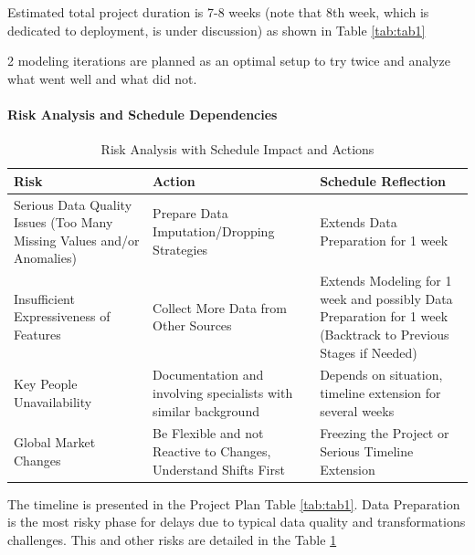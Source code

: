 \documentclass[oneside,final,12pt,a4paper]{extreport}
\begin{document}
Estimated total project duration is 7-8 weeks (note that 8th week, which is dedicated to deployment, is under discussion) as shown in Table \ref{tab:tab1}

2 modeling iterations are planned as an optimal setup to try twice and analyze what went well and what did not.

\paragraph{Risk Analysis and Schedule Dependencies}

\begin{table}[h!]
\centering
\small
\begin{tabular}{|p{5cm}|p{5cm}|p{5cm}|}
\hline
\textbf{Risk} & \textbf{Action} & \textbf{Schedule Reflection} \\
\hline
Serious Data Quality Issues (Too Many Missing Values and/or Anomalies) & Prepare Data Imputation/Dropping Strategies  & Extends Data Preparation for 1 week  \\
\hline
Insufficient Expressiveness of Features & Collect More Data from Other Sources & Extends Modeling for 1 week and possibly Data Preparation for 1 week (Backtrack to Previous Stages if Needed) \\
\hline
Key People Unavailability & Documentation and involving specialists with similar background & Depends on situation, timeline extension for several weeks \\
\hline
Global Market Changes & Be Flexible and not Reactive to Changes, Understand Shifts First & Freezing the Project or Serious Timeline Extension \\
\hline
\end{tabular}
\caption{Risk Analysis with Schedule Impact and Actions}
\label{tab:tab2}
\end{table}

\par The timeline is presented in the Project Plan Table \ref{tab:tab1}. Data Preparation is the most risky phase for delays due to typical data quality and transformations challenges. This and other risks are detailed in the Table \ref{tab:tab2}
\end{document}
